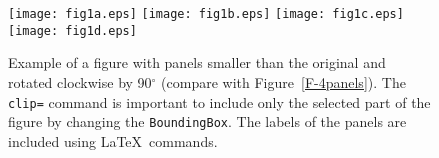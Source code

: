 \documentclass[namedreferences]{solarphysics}
\begin{document}
\begin{article}
{%

  \begin{figure}    %
   \centerline{\texttt{[image: fig1a.eps]}
               \texttt{[image: fig1b.eps]}
               \texttt{[image: fig1c.eps]}
               \texttt{[image: fig1d.eps]}
              }
     \vspace{-0.39\textwidth}   %
     \centerline{\Large \bf     %
      \hspace{0.07\textwidth}   \color{white}{(a)}
      \hspace{0.122\textwidth}  \color{black}{(b)}
      \hspace{0.122\textwidth}  \color{white}{(c)}
      \hspace{0.122\textwidth}  \color{white}{(d)}
         \hfill}
     \vspace{0.36\textwidth}    %
\caption{Example of a figure with panels smaller
than the original and rotated clockwise by 90$^{\circ}$ 
(compare with Figure~\ref{F-4panels}). The \texttt{clip=} 
command is important to include only the selected part of the figure 
by changing the \texttt{BoundingBox}. 
The labels of the panels are included using \LaTeX\ commands. 
        }
   \label{F-rotate-cut}
   \end{figure}
   

}
\end{article}
\end{document}
